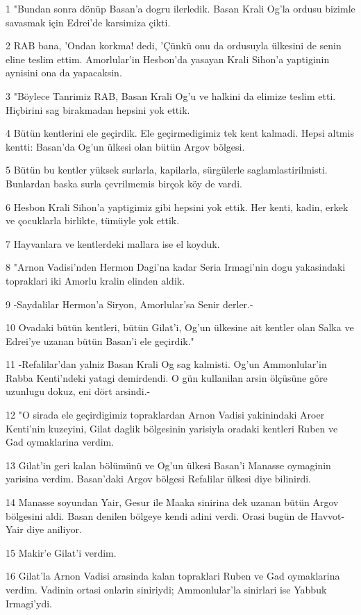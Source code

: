\par 1 "Bundan sonra dönüp Basan'a dogru ilerledik. Basan Krali Og'la ordusu bizimle savasmak için Edrei'de karsimiza çikti.
\par 2 RAB bana, 'Ondan korkma! dedi, 'Çünkü onu da ordusuyla ülkesini de senin eline teslim ettim. Amorlular'in Hesbon'da yasayan Krali Sihon'a yaptiginin aynisini ona da yapacaksin.
\par 3 "Böylece Tanrimiz RAB, Basan Krali Og'u ve halkini da elimize teslim etti. Hiçbirini sag birakmadan hepsini yok ettik.
\par 4 Bütün kentlerini ele geçirdik. Ele geçirmedigimiz tek kent kalmadi. Hepsi altmis kentti: Basan'da Og'un ülkesi olan bütün Argov bölgesi.
\par 5 Bütün bu kentler yüksek surlarla, kapilarla, sürgülerle saglamlastirilmisti. Bunlardan baska surla çevrilmemis birçok köy de vardi.
\par 6 Hesbon Krali Sihon'a yaptigimiz gibi hepsini yok ettik. Her kenti, kadin, erkek ve çocuklarla birlikte, tümüyle yok ettik.
\par 7 Hayvanlara ve kentlerdeki mallara ise el koyduk.
\par 8 "Arnon Vadisi'nden Hermon Dagi'na kadar Seria Irmagi'nin dogu yakasindaki topraklari iki Amorlu kralin elinden aldik.
\par 9 -Saydalilar Hermon'a Siryon, Amorlular'sa Senir derler.-
\par 10 Ovadaki bütün kentleri, bütün Gilat'i, Og'un ülkesine ait kentler olan Salka ve Edrei'ye uzanan bütün Basan'i ele geçirdik."
\par 11 -Refalilar'dan yalniz Basan Krali Og sag kalmisti. Og'un Ammonlular'in Rabba Kenti'ndeki yatagi demirdendi. O gün kullanilan arsin ölçüsüne göre uzunlugu dokuz, eni dört arsindi.-
\par 12 "O sirada ele geçirdigimiz topraklardan Arnon Vadisi yakinindaki Aroer Kenti'nin kuzeyini, Gilat daglik bölgesinin yarisiyla oradaki kentleri Ruben ve Gad oymaklarina verdim.
\par 13 Gilat'in geri kalan bölümünü ve Og'un ülkesi Basan'i Manasse oymaginin yarisina verdim. Basan'daki Argov bölgesi Refalilar ülkesi diye bilinirdi.
\par 14 Manasse soyundan Yair, Gesur ile Maaka sinirina dek uzanan bütün Argov bölgesini aldi. Basan denilen bölgeye kendi adini verdi. Orasi bugün de Havvot-Yair diye aniliyor.
\par 15 Makir'e Gilat'i verdim.
\par 16 Gilat'la Arnon Vadisi arasinda kalan topraklari Ruben ve Gad oymaklarina verdim. Vadinin ortasi onlarin siniriydi; Ammonlular'la sinirlari ise Yabbuk Irmagi'ydi.
